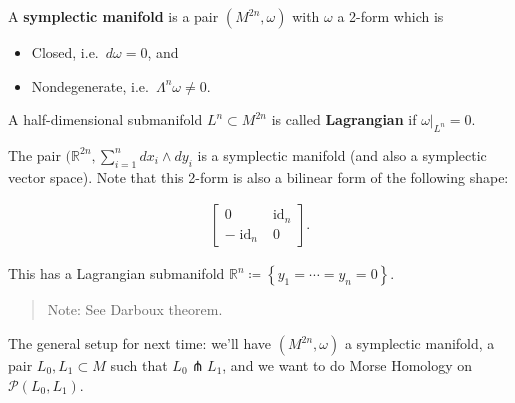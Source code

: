 \begin{definition}

A \textbf{symplectic manifold} is a pair \((M^{2n}, \omega)\) with
\(\omega\) a 2-form which is

\begin{itemize}
\tightlist
\item
  Closed, i.e.~\(d \omega = 0\), and
\item
  Nondegenerate, i.e.~\(\Lambda^n \omega \neq 0\).
\end{itemize}

\end{definition}

\begin{definition}

A half-dimensional submanifold \(L^n \subset M^{2n}\) is called
\textbf{Lagrangian} if \({ \left.{{ \omega}} \right|_{{L^n}} } = 0\).

\end{definition}

\begin{example}[?]

The pair \(({\mathbb{R}}^{2n}, \sum_{i=1}^n dx_i \wedge dy_i\) is a
symplectic manifold (and also a symplectic vector space). Note that this
2-form is also a bilinear form of the following shape:

\begin{align*}
\begin{bmatrix}
0 & \operatorname{id}_n 
\\
-\operatorname{id}_n & 0
\end{bmatrix}
.\end{align*}

This has a Lagrangian submanifold
\({\mathbb{R}}^n \coloneqq\left\{{y_1 = \cdots = y_n = 0}\right\}\).

\end{example}

\begin{quote}
Note: See Darboux theorem.
\end{quote}

\begin{remark}

The general setup for next time: we'll have \((M^{2n}, \omega)\) a
symplectic manifold, a pair \(L_0, L_1 \subset M\) such that
\(L_0 \pitchfork L_1\), and we want to do Morse Homology on
\(\mathcal{P}(L_0, L_1)\).

\end{remark}

